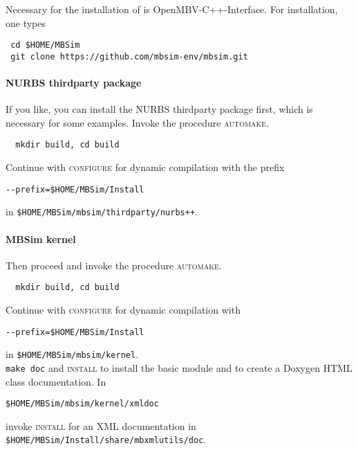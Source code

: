 \subsubsection{\MBSim}
Necessary for the installation of \MBSim{} is OpenMBV-C++-Interface. For installation, one types
\begin{verbatim}
 cd $HOME/MBSim
 git clone https://github.com/mbsim-env/mbsim.git
\end{verbatim}
%
\paragraph{NURBS thirdparty package}
If you like, you can install the NURBS thirdparty package first, which is necessary for some examples. Invoke the procedure \textsc{automake}.
\begin{verbatim}
  mkdir build, cd build
\end{verbatim}
Continue with \textsc{configure} for dynamic compilation with the prefix
\begin{verbatim}
--prefix=$HOME/MBSim/Install
\end{verbatim}
in \texttt{\$HOME/MBSim/mbsim/thirdparty/nurbs++}.
%
\paragraph{MBSim kernel}
Then proceed and invoke the procedure \textsc{automake}.
\begin{verbatim}
  mkdir build, cd build
\end{verbatim}
Continue with \textsc{configure} for dynamic compilation with
\begin{verbatim}
--prefix=$HOME/MBSim/Install
\end{verbatim}
in \texttt{\$HOME/MBSim/mbsim/kernel}.\\
%
\texttt{make doc} and \textsc{install} to install the basic module and to create a Doxygen HTML class documentation. In
\begin{verbatim}
$HOME/MBSim/mbsim/kernel/xmldoc
\end{verbatim}
invoke \textsc{install} for an XML documentation in\\
\texttt{\$HOME/MBSim/Install/share/mbxmlutils/doc}.
%
